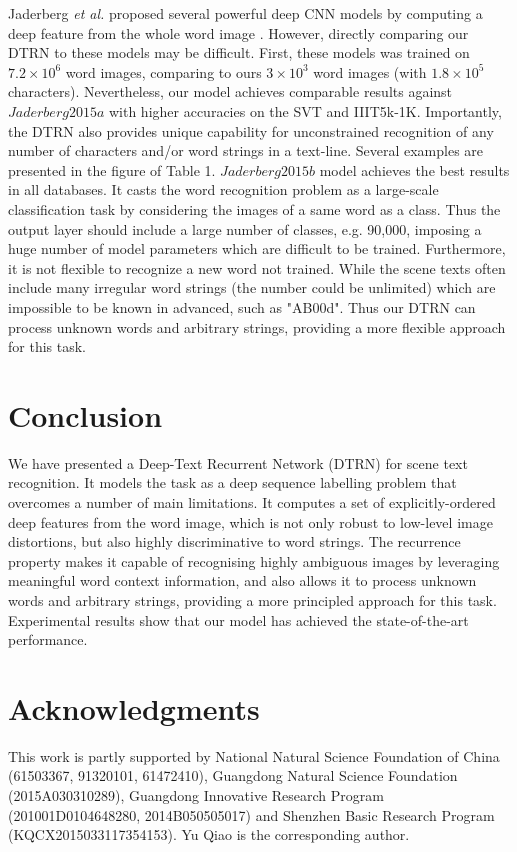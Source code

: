 \documentclass[letterpaper]{article}
\begin{document}
Jaderberg \emph{et al.}  proposed several powerful deep CNN models by computing a deep feature from the whole word image \cite{Jaderberg2014b,Jaderberg2015a,Jaderberg2015b}. However, directly comparing our DTRN to these models may be difficult. First, these models was trained on $7.2\times10^6$ word images, comparing to ours $3\times10^3$ word images (with $1.8\times10^5$ characters). Nevertheless,
our model achieves comparable results against $Jaderberg2015a$ with higher accuracies on the SVT and IIIT5k-1K. Importantly, the DTRN also provides unique capability for unconstrained recognition of any number of characters and/or word strings in a text-line. Several examples are presented in the figure of Table 1. $Jaderberg2015b$ model achieves the best results in all databases.  It casts the word recognition problem as a large-scale classification task by considering the images of a same word as a class.
Thus the output layer should include a large number of classes, e.g. 90,000, imposing a huge number of model parameters which are difficult to be trained.
Furthermore, it is not flexible to recognize a new word not trained.
While the scene texts often include many irregular word strings (the number could be unlimited) which are impossible to be known in advanced, such as "AB00d".
Thus our DTRN can process unknown words and arbitrary strings, providing a more flexible approach for this task.

\section{Conclusion}

We have presented a Deep-Text Recurrent Network (DTRN) for scene text recognition.  It models the task as a deep sequence labelling problem that overcomes a number of main limitations. It computes a set of explicitly-ordered deep features from the word image, which is not only robust to low-level image distortions, but also highly discriminative to word strings. The recurrence property makes it capable of recognising highly ambiguous images by leveraging meaningful word context information, and also allows it to process unknown words and arbitrary strings, providing a more principled approach for this task. Experimental results show that our model has achieved the state-of-the-art performance.



\section{ Acknowledgments}
This work is partly supported by National Natural Science Foundation of China (61503367, 91320101, 61472410), Guangdong Natural Science Foundation (2015A030310289), Guangdong Innovative Research Program (201001D0104648280, 2014B050505017) and Shenzhen Basic Research Program (KQCX2015033117354153). Yu Qiao is the corresponding author.
\end{document}
